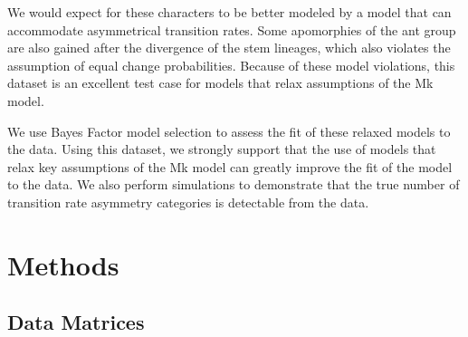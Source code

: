 \documentclass[]{article}
\begin{document}
We would expect for these characters to be better modeled by a model that can accommodate asymmetrical transition rates.
Some apomorphies of the ant group are also gained after the divergence of the stem lineages, which also violates the assumption of equal change probabilities.
Because of these model violations, this dataset is an excellent test case for models that relax assumptions of the Mk model. \par
We use Bayes Factor model selection to assess the fit of these relaxed models to the data.
Using this dataset, we strongly support that the use of models that relax key assumptions of the Mk model can greatly improve the fit of the model to the data.
We also perform simulations to demonstrate that the true number of transition rate asymmetry categories is detectable from the data.

\section{Methods}


\subsection{Data Matrices}
\end{document}
